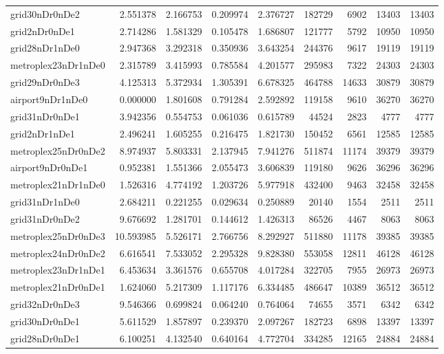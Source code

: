 \begin{longtable}{|l|r|r|r|r|r|r|r|r|}
grid30nDr0nDe2 & 2.551378 & 2.166753 & 0.209974 & 2.376727 & 182729 & 6902 & 13403 & 13403 \\
grid2nDr0nDe1 & 2.714286 & 1.581329 & 0.105478 & 1.686807 & 121777 & 5792 & 10950 & 10950 \\
grid28nDr1nDe0 & 2.947368 & 3.292318 & 0.350936 & 3.643254 & 244376 & 9617 & 19119 & 19119 \\
metroplex23nDr1nDe0 & 2.315789 & 3.415993 & 0.785584 & 4.201577 & 295983 & 7322 & 24303 & 24303 \\
grid29nDr0nDe3 & 4.125313 & 5.372934 & 1.305391 & 6.678325 & 464788 & 14633 & 30879 & 30879 \\
airport9nDr1nDe0 & 0.000000 & 1.801608 & 0.791284 & 2.592892 & 119158 & 9610 & 36270 & 36270 \\
grid31nDr0nDe1 & 3.942356 & 0.554753 & 0.061036 & 0.615789 & 44524 & 2823 & 4777 & 4777 \\
grid2nDr1nDe1 & 2.496241 & 1.605255 & 0.216475 & 1.821730 & 150452 & 6561 & 12585 & 12585 \\
metroplex25nDr0nDe2 & 8.974937 & 5.803331 & 2.137945 & 7.941276 & 511874 & 11174 & 39379 & 39379 \\
airport9nDr0nDe1 & 0.952381 & 1.551366 & 2.055473 & 3.606839 & 119180 & 9626 & 36296 & 36296 \\
metroplex21nDr1nDe0 & 1.526316 & 4.774192 & 1.203726 & 5.977918 & 432400 & 9463 & 32458 & 32458 \\
grid31nDr1nDe0 & 2.684211 & 0.221255 & 0.029634 & 0.250889 & 20140 & 1554 & 2511 & 2511 \\
grid31nDr0nDe2 & 9.676692 & 1.281701 & 0.144612 & 1.426313 & 86526 & 4467 & 8063 & 8063 \\
metroplex25nDr0nDe3 & 10.593985 & 5.526171 & 2.766756 & 8.292927 & 511880 & 11178 & 39385 & 39385 \\
metroplex24nDr0nDe2 & 6.616541 & 7.533052 & 2.295328 & 9.828380 & 553058 & 12811 & 46128 & 46128 \\
metroplex23nDr1nDe1 & 6.453634 & 3.361576 & 0.655708 & 4.017284 & 322705 & 7955 & 26973 & 26973 \\
metroplex21nDr0nDe1 & 1.624060 & 5.217309 & 1.117176 & 6.334485 & 486647 & 10389 & 36512 & 36512 \\
grid32nDr0nDe3 & 9.546366 & 0.699824 & 0.064240 & 0.764064 & 74655 & 3571 & 6342 & 6342 \\
grid30nDr0nDe1 & 5.611529 & 1.857897 & 0.239370 & 2.097267 & 182723 & 6898 & 13397 & 13397 \\
grid28nDr0nDe1 & 6.100251 & 4.132540 & 0.640164 & 4.772704 & 334285 & 12165 & 24884 & 24884 \\

\end{longtable}
